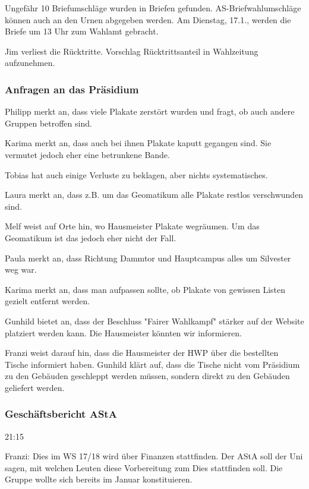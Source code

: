 \documentclass[ngerman,headheight=70pt]{scrartcl}
\begin{document}
    Ungefähr 10 Briefumschläge wurden in Briefen gefunden. AS-Briefwahlumschläge
    können auch an den Urnen abgegeben werden. Am Dienstag, 17.1., werden die
    Briefe um 13 Uhr zum Wahlamt gebracht.

    Jim verliest die Rücktritte. Vorschlag Rücktrittsanteil in Wahlzeitung
    aufzunehmen.

    \subsubsection{Anfragen an das Präsidium}

    Philipp merkt an, dass viele Plakate zerstört wurden und fragt, ob auch andere
    Gruppen betroffen sind.

    Karima merkt an, dass auch bei ihnen Plakate kaputt gegangen sind. Sie vermutet
    jedoch eher eine betrunkene Bande.

    Tobias hat auch einige Verluste zu beklagen, aber nichts systematisches.

    Laura merkt an, dass z.B. um das Geomatikum alle Plakate restlos verschwunden
    sind.

    Melf weist auf Orte hin, wo Hausmeister Plakate wegräumen. Um das Geomatikum
    ist das jedoch eher nicht der Fall.

    Paula merkt an, dass Richtung Dammtor und Hauptcampus alles um Silvester
    weg war.

    Karima merkt an, dass man aufpassen sollte, ob Plakate von gewissen Listen
    gezielt entfernt werden.

    Gunhild bietet an, dass der Beschluss "Fairer Wahlkampf" stärker auf der
    Website platziert werden kann. Die Hausmeister könnten wir informieren.

    Franzi weist darauf hin, dass die Hausmeister der HWP über die bestellten
    Tische informiert haben. Gunhild klärt auf, dass die Tische nicht vom
    Präsidium zu den Gebäuden geschleppt werden müssen, sondern direkt zu den
    Gebäuden geliefert werden.

    \subsubsection{Geschäftsbericht AStA}

    21:15

    Franzi:
    Dies im WS 17/18 wird über Finanzen stattfinden. Der AStA soll der Uni sagen,
    mit welchen Leuten diese Vorbereitung zum Dies stattfinden soll. Die Gruppe
    wollte sich bereits im Januar konstituieren.
\end{document}
